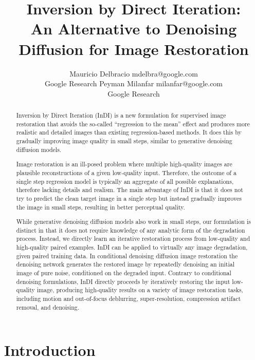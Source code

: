 \documentclass[10pt]{article} %
\title{Inversion by Direct Iteration: \\
An Alternative to Denoising Diffusion for Image Restoration}
\author{\name Mauricio Delbracio \email mdelbra@google.com \\
      \addr Google Research
      \AND
      \name Peyman Milanfar \email milanfar@google.com \\
      \addr Google Research}
\begin{document}
\maketitle



\begin{abstract}
Inversion by Direct Iteration (InDI) is a new formulation for supervised image restoration that avoids the so-called ``regression to the mean'' effect and produces more realistic and detailed images than existing regression-based methods. It does this by gradually improving image quality in small steps, similar to generative denoising diffusion models.

Image restoration is an ill-posed problem where multiple high-quality images are plausible reconstructions of a given low-quality input. Therefore, the outcome of a single step regression model is typically  an aggregate of all possible explanations, therefore lacking details and realism.
The main advantage of InDI is that it does not try to predict the clean target image in a single step but instead gradually improves the image in small steps, resulting in better perceptual quality.

While generative denoising diffusion models also work in small steps, our formulation is distinct in that it does not require knowledge of any analytic form of the degradation process. Instead, we directly learn an iterative restoration process from low-quality and high-quality paired examples. InDI can be applied to virtually any image degradation, given paired training data. In conditional denoising diffusion image restoration the denoising network generates the restored image by repeatedly denoising an initial image of pure noise, conditioned on the degraded input. Contrary to conditional denoising formulations, InDI directly proceeds by iteratively restoring the input low-quality image, producing high-quality results on a variety of image restoration tasks, including motion and out-of-focus deblurring, super-resolution, compression artifact removal, and denoising.
\end{abstract}




\section{Introduction}
\label{sec:intro}
\end{document}
